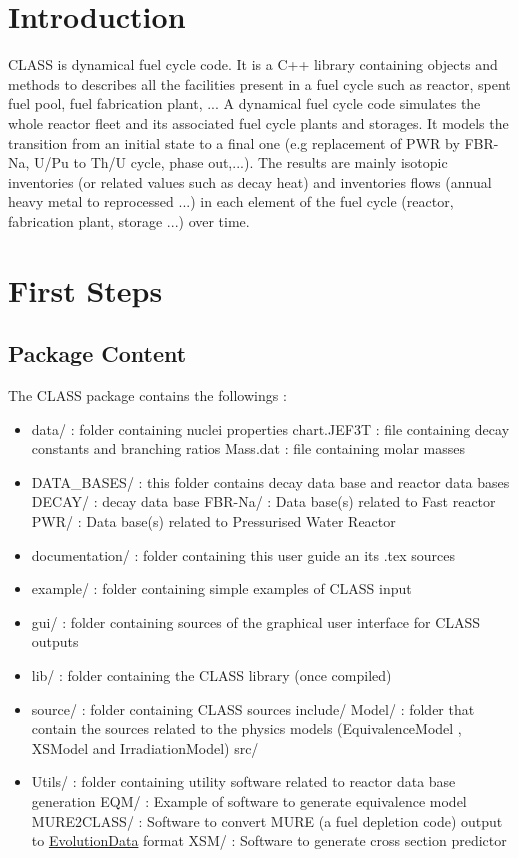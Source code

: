 \part{Introduction}
CLASS is dynamical fuel cycle code. It is a C++ library containing objects and methods to describes all the facilities present in a fuel cycle such as reactor, spent fuel pool, fuel fabrication plant, ...
A  dynamical fuel cycle code simulates the whole reactor fleet and its associated fuel cycle plants and storages. It models the transition from an initial state to a final one (e.g replacement of PWR by FBR-Na, U/Pu to Th/U cycle, phase out,...). The results are mainly isotopic inventories (or related values such as decay heat) and inventories flows (annual heavy metal to reprocessed ...) in each element of the fuel cycle (reactor, fabrication plant, storage ...) over time. 


\part{First Steps}
\chapter{Package Content}
The CLASS package contains the followings :
\begin{itemize}
\item data/ : folder containing nuclei properties
\subitem chart.JEF3T : file containing decay constants and branching ratios
\subitem Mass.dat : file containing molar masses

 \item DATA\_BASES/ : this folder contains decay data base and reactor data bases
 \subitem DECAY/ : decay data base
 \subitem FBR-Na/ : Data base(s) related to Fast reactor
 \subitem PWR/ : Data base(s) related to Pressurised Water Reactor
 
 \item documentation/ : folder containing this user guide an its .tex sources

\item example/ : folder containing simple examples of CLASS input

\item gui/ : folder containing sources of the graphical user interface for CLASS outputs

\item lib/ : folder containing the CLASS library (once compiled)
\item source/ : folder containing CLASS sources
\subitem include/
\subitem Model/ : folder that contain the sources related to the physics models (EquivalenceModel , XSModel and IrradiationModel)
\subitem src/
\item Utils/ : folder containing utility software related to reactor data base generation
\subitem EQM/ : Example of software to generate equivalence model
\subitem MURE2CLASS/ : Software to convert MURE (a fuel depletion code)  output to \hyperref[sec:EvolutionData]{EvolutionData} format
\subitem XSM/ : Software to generate cross section predictor
 
 
\end{itemize}

